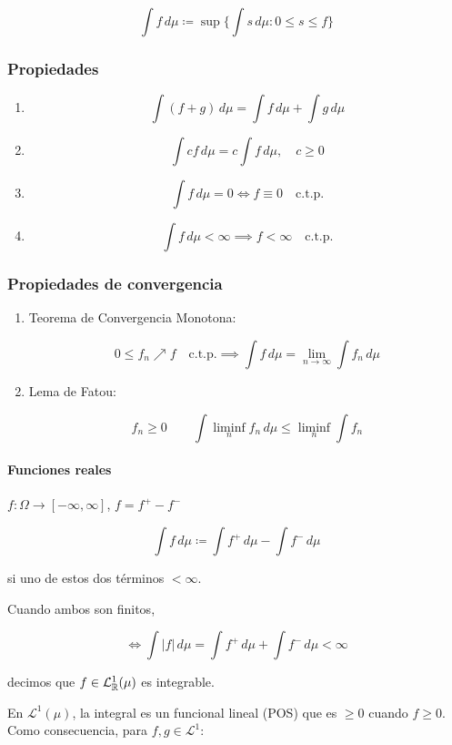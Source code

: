 \[\int f\,d\mu\coloneqq \sup \{\int s\,d\mu:0\leq s\leq f\}\]

\subsubsection*{Propiedades}

\begin{enumerate}
    \item \[\int (f+g)\,d\mu=\int f\,d\mu+\int g\,d\mu\]
    \item \[\int cf\,d\mu=c\int f\,d\mu,\quad c\geq 0\]
    \item \[\int f\,d\mu=0\iff f\equiv 0\quad \text{c.t.p.}\]
    \item \[\int f\,d\mu<\infty\implies f<\infty \quad\text{c.t.p.}\]
\end{enumerate}

\subsubsection*{Propiedades de convergencia}

\begin{enumerate}
    \item Teorema de Convergencia Monotona:
    
    \[0\leq f_n\nearrow f \quad\text{c.t.p.} \implies \int f\,d\mu=\lim_{n\to\infty}\int f_n\,d\mu\]

    \item Lema de Fatou:
    
    \[f_n\geq 0\qquad \int \liminf_{n} f_n\,d\mu\leq \liminf_n \int f_n\]
\end{enumerate}

\paragraph{Funciones reales}

$f:\Omega\to [-\infty,\infty]$, $f=f^+ - f^-$

\[\int f\,d\mu\coloneqq \int f^+\,d\mu-\int f^-\,d\mu\]

si uno de estos dos términos $<\infty$.

Cuando ambos son finitos,

\[\iff \int |f|\,d\mu=\int f^+\,d\mu+\int f^-\,d\mu<\infty\]

decimos que $f\in \mathcal{L}_{\mathbb{R}}^1(\mu)$ es integrable.

En $\mathcal{L}^1(\mu)$, la integral es un funcional lineal (POS) que es $\geq 0$ cuando $f\geq 0$. Como consecuencia, para $f,g\in\mathcal{L}^1$:

